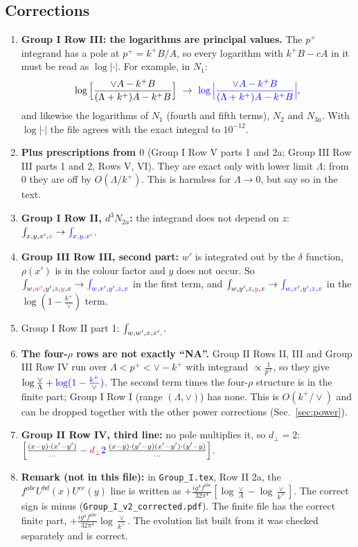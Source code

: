 \documentclass[10pt]{article}
\numberwithin{equation}{section}
\newcommand{\new}[1]{{\color{blue}#1}}
\newcommand{\old}[1]{{\color{red}#1}}
\begin{document}
\subsection{Corrections}
\begin{enumerate}
\item[\textbf{F1}] \textbf{Group I Row III: the logarithms are principal values.} The $p^+$ integrand has a pole at $p^+=k^+B/A$, so every logarithm with $k^+B-cA$ in it must be read as $\log|\cdot|$. For example, in $N_1$:
\begin{equation*}
\log\Big[\frac{\vee A-k^+B}{(\Lambda+k^+)A-k^+B}\Big]\ \to\ \new{\log\Big|\frac{\vee A-k^+B}{(\Lambda+k^+)A-k^+B}\Big|},
\end{equation*}
and likewise the logarithms of $N_1$ (fourth and fifth terms), $N_2$ and $N_{3a}$. With $\log|\cdot|$ the file agrees with the exact integral to $10^{-12}$.
\item[\textbf{F2}] \textbf{Plus prescriptions from $0$} (Group I Row V parts 1 and 2a; Group III Row III parts 1 and 2, Rows V, VI). They are exact only with lower limit $\Lambda$; from $0$ they are off by $O(\Lambda/k^+)$. This is harmless for $\Lambda\to0$, but say so in the text.
\item[\textbf{F3}] \textbf{Group I Row II, $d^3N_{2a}$:} the integrand does not depend on $z$: $\int_{x,y,x',\old{z}}\to\new{\int_{x,y,x'}}$.
\item[\textbf{F4}] \textbf{Group III Row III, second part:} $w'$ is integrated out by the $\delta$ function, $\rho(x')$ is in the colour factor and $y$ does not occur. So $\int_{w,\old{w'},y',z,\old{y},x}\to\new{\int_{w,x',y',z,x}}$ in the first term, and $\int_{w,y',z,\old{y},x}\to\new{\int_{w,x',y',z,x}}$ in the $\log(1-\frac{k^+}{\vee})$ term.
\item[\textbf{F5}] Group I Row II part 1: $\int_{w,w',x,x'\old{,}}$.
\item[\textbf{F6}] \textbf{The four-$\rho$ rows are not exactly ``NA''.} Group II Rows II, III and Group III Row IV run over $\Lambda<p^+<\vee-k^+$ with integrand $\propto\frac1{p^+}$, so they give $\log\frac{\vee}{\Lambda}+\new{\log(1-\frac{k^+}{\vee})}$. The second term times the four-$\rho$ structure is in the finite part; Group I Row I (range $(\Lambda,\vee)$) has none. This is $O(k^+/\vee)$ and can be dropped together with the other power corrections (Sec.~\ref{sec:power}).
\item[\textbf{F7}] \textbf{Group II Row IV, third line:} no pole multiplies it, so $d_\perp=2$: $\Big[\frac{(x-y)\cdot(x'-y')}{\dots}-\old{d_\perp}\new{2}\,\frac{(x-y)\cdot(y'-y)(x'-y')\cdot(y'-y)}{\dots}\Big]$.
\item[\textbf{R}] \textbf{Remark (not in this file):} in \texttt{Group\_I.tex}, Row II 2a, the $f^{abc}U^{bd}(x)U^{ce}(y)$ line is written as $+\frac{ig^4f^{abc}}{32\pi^4}[\log\frac{\vee}{\Lambda}-\log\frac{\vee}{k^+}]$. The correct sign is minus (\texttt{Group\_I\_v2\_corrected.pdf}). The finite file has the correct finite part, $+\frac{ig^4f^{abc}}{32\pi^4}\log\frac{\vee}{k^+}$. The evolution list built from it was checked separately and is correct.
\end{enumerate}
\end{document}
